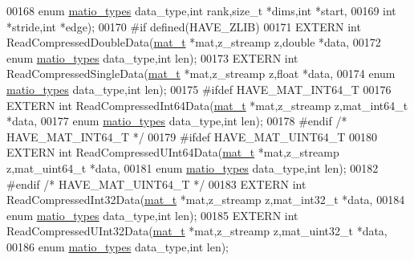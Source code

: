 \begin{DoxyCode}
00168                \textcolor{keyword}{enum} \hyperlink{group___m_a_t_gacf7b3b879282b7ab3a51190e49bf3453}{matio\_types} data\_type,\textcolor{keywordtype}{int} rank,\textcolor{keywordtype}{size\_t} *dims,\textcolor{keywordtype}{int} *start,
00169                \textcolor{keywordtype}{int} *stride,\textcolor{keywordtype}{int} *edge);
00170 \textcolor{preprocessor}{#if defined(HAVE\_ZLIB)}
00171 EXTERN \textcolor{keywordtype}{int} ReadCompressedDoubleData(\hyperlink{struct__mat__t}{mat\_t} *mat,z\_streamp z,\textcolor{keywordtype}{double}  *data,
00172                \textcolor{keyword}{enum} \hyperlink{group___m_a_t_gacf7b3b879282b7ab3a51190e49bf3453}{matio\_types} data\_type,\textcolor{keywordtype}{int} len);
00173 EXTERN \textcolor{keywordtype}{int} ReadCompressedSingleData(\hyperlink{struct__mat__t}{mat\_t} *mat,z\_streamp z,\textcolor{keywordtype}{float}   *data,
00174                \textcolor{keyword}{enum} \hyperlink{group___m_a_t_gacf7b3b879282b7ab3a51190e49bf3453}{matio\_types} data\_type,\textcolor{keywordtype}{int} len);
00175 \textcolor{preprocessor}{#ifdef HAVE\_MAT\_INT64\_T}
00176 EXTERN \textcolor{keywordtype}{int} ReadCompressedInt64Data(\hyperlink{struct__mat__t}{mat\_t} *mat,z\_streamp z,mat\_int64\_t *data,
00177                \textcolor{keyword}{enum} \hyperlink{group___m_a_t_gacf7b3b879282b7ab3a51190e49bf3453}{matio\_types} data\_type,\textcolor{keywordtype}{int} len);
00178 \textcolor{preprocessor}{#endif }\textcolor{comment}{/* HAVE\_MAT\_INT64\_T */}\textcolor{preprocessor}{}
00179 \textcolor{preprocessor}{#ifdef HAVE\_MAT\_UINT64\_T}
00180 EXTERN \textcolor{keywordtype}{int} ReadCompressedUInt64Data(\hyperlink{struct__mat__t}{mat\_t} *mat,z\_streamp z,mat\_uint64\_t *data,
00181                \textcolor{keyword}{enum} \hyperlink{group___m_a_t_gacf7b3b879282b7ab3a51190e49bf3453}{matio\_types} data\_type,\textcolor{keywordtype}{int} len);
00182 \textcolor{preprocessor}{#endif }\textcolor{comment}{/* HAVE\_MAT\_UINT64\_T */}\textcolor{preprocessor}{}
00183 EXTERN \textcolor{keywordtype}{int} ReadCompressedInt32Data(\hyperlink{struct__mat__t}{mat\_t} *mat,z\_streamp z,mat\_int32\_t *data,
00184                \textcolor{keyword}{enum} \hyperlink{group___m_a_t_gacf7b3b879282b7ab3a51190e49bf3453}{matio\_types} data\_type,\textcolor{keywordtype}{int} len);
00185 EXTERN \textcolor{keywordtype}{int} ReadCompressedUInt32Data(\hyperlink{struct__mat__t}{mat\_t} *mat,z\_streamp z,mat\_uint32\_t *data,
00186                \textcolor{keyword}{enum} \hyperlink{group___m_a_t_gacf7b3b879282b7ab3a51190e49bf3453}{matio\_types} data\_type,\textcolor{keywordtype}{int} len);

\end{DoxyCode}
